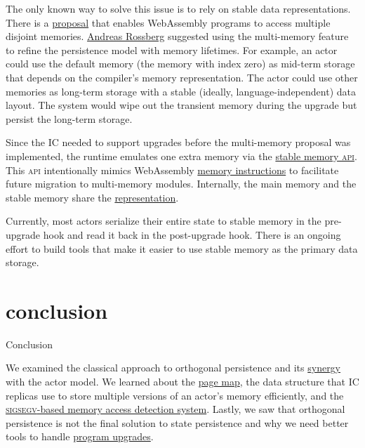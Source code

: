 \documentclass{article}
\begin{document}
The only known way to solve this issue is to rely on stable data representations.
There is a \href{https://github.com/WebAssembly/multi-memory}{proposal} that enables WebAssembly programs to access multiple disjoint memories.
\href{https://people.mpi-sws.org/~rossberg/}{Andreas Rossberg} suggested using the multi-memory feature to refine the persistence model with memory lifetimes.
For example, an actor could use the default memory (the memory with index zero) as mid-term storage that depends on the compiler's memory representation.
The actor could use other memories as long-term storage with a stable (ideally, language-independent) data layout.
The system would wipe out the transient memory during the upgrade but persist the long-term storage.

Since the IC needed to support upgrades before the multi-memory proposal was implemented, the runtime emulates one extra memory via the \href{https://smartcontracts.org/docs/interface-spec/index.html#system-api-stable-memory}{stable memory \textsc{api}}.
This \textsc{api} intentionally mimics WebAssembly \href{https://webassembly.github.io/bulk-memory-operations/core/exec/instructions.html#memory-instructions}{memory instructions} to facilitate future migration to multi-memory modules.
Internally, the main memory and the stable memory share the \href{#snapshots-deltas}{representation}.

Currently, most actors serialize their entire state to stable memory in the pre-upgrade hook and read it back in the post-upgrade hook.
There is an ongoing effort to build tools that make it easier to use stable memory as the primary data storage.

\section{conclusion}{Conclusion}

We examined the classical approach to orthogonal persistence and its \href{#actors}{synergy} with the actor model.
We learned about the \href{#snapshots-deltas}{page map}, the data structure that IC replicas use to store multiple versions of an actor's memory efficiently, and the \href{#signal-handler}{\textsc{sigsegv}-based memory access detection system}.
Lastly, we saw that orthogonal persistence is not the final solution to state persistence and why we need better tools to handle \href{#upgrades}{program upgrades}.
\end{document}
